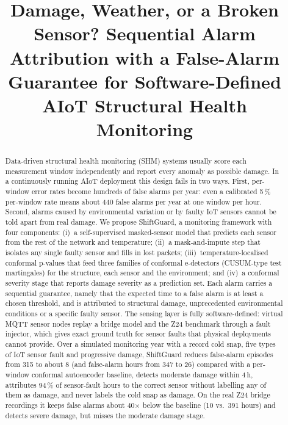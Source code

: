 \documentclass[conference]{IEEEtran}
\begin{document}
\title{Damage, Weather, or a Broken Sensor? Sequential Alarm Attribution with a False-Alarm Guarantee for Software-Defined AIoT Structural Health Monitoring}

\author{
}

\maketitle

\begin{abstract}
Data-driven structural health monitoring (SHM) systems usually score each measurement window independently and report every anomaly as possible damage. In a continuously running AIoT deployment this design fails in two ways. First, per-window error rates become hundreds of false alarms per year: even a calibrated 5\,\% per-window rate means about 440 false alarms per year at one window per hour. Second, alarms caused by environmental variation or by faulty IoT sensors cannot be told apart from real damage. We propose ShiftGuard, a monitoring framework with four components: (i)~a self-supervised masked-sensor model that predicts each sensor from the rest of the network and temperature; (ii)~a mask-and-impute step that isolates any single faulty sensor and fills in lost packets; (iii)~temperature-localised conformal p-values that feed three families of conformal e-detectors (CUSUM-type test martingales) for the structure, each sensor and the environment; and (iv)~a conformal severity stage that reports damage severity as a prediction set. Each alarm carries a sequential guarantee, namely that the expected time to a false alarm is at least a chosen threshold, and is attributed to structural damage, unprecedented environmental conditions or a specific faulty sensor. The sensing layer is fully software-defined: virtual MQTT sensor nodes replay a bridge model and the Z24 benchmark through a fault injector, which gives exact ground truth for sensor faults that physical deployments cannot provide. Over a simulated monitoring year with a record cold snap, five types of IoT sensor fault and progressive damage, ShiftGuard reduces false-alarm episodes from 315 to about 8 (and false-alarm hours from 347 to 26) compared with a per-window conformal autoencoder baseline, detects moderate damage within 4\,h, attributes 94\,\% of sensor-fault hours to the correct sensor without labelling any of them as damage, and never labels the cold snap as damage. On the real Z24 bridge recordings it keeps false alarms about 40$\times$ below the baseline (10 vs.\ 391 hours) and detects severe damage, but misses the moderate damage stage.
\end{abstract}
\end{document}
